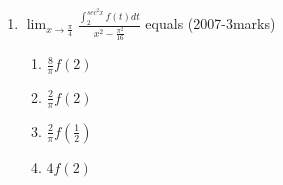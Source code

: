 \documentclass[journal,12pt,twocolumn]{IEEEtran}
\theoremstyle{remark}
\begin{document}
\begin{enumerate}[start=17]
\item %
{\begin{flushleft}
$\lim_{x \to \frac{\pi}{4}}$$ \displaystyle \frac{\int_2^{sec^2x} f(t) dt}{x^2-\frac{\pi^2}{16}}$ equals \hfill{(2007-3marks)}
    \begin{enumerate}
     \item $\frac{8}{\pi}f(2)$
     \item $\frac{2}{\pi}f(2)$
     \item $\frac{2}{\pi}f(\frac{1}{2})$
     \item $4f(2)$\\
    \end{enumerate}
\end{flushleft}}

\end{enumerate}
\end{document}
